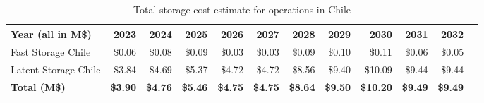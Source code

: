 \tiny \begin{longtable} { |p{}  |r  |r  |r  |r  |r  |r  |r  |r  |r  |r  |r |} 
\caption{Total storage cost estimate for operations in Chile \label{tab:opsStorageChile}}\\ 
\hline 
\textbf{Year (all in M\$)}&\textbf{2023}&\textbf{2024}&\textbf{2025}&\textbf{2026}&\textbf{2027}&\textbf{2028}&\textbf{2029}&\textbf{2030}&\textbf{2031}&\textbf{2032} \\ \hline
{Fast Storage Chile}&{\$0.06}&{\$0.08}&{\$0.09}&{\$0.03}&{\$0.03}&{\$0.09}&{\$0.10}&{\$0.11}&{\$0.06}&{\$0.05} \\ \hline
{Latent Storage Chile}&{\$3.84}&{\$4.69}&{\$5.37}&{\$4.72}&{\$4.72}&{\$8.56}&{\$9.40}&{\$10.09}&{\$9.44}&{\$9.44} \\ \hline
\textbf{Total (M\$)}&\textbf{\$3.90}&\textbf{\$4.76}&\textbf{\$5.46}&\textbf{\$4.75}&\textbf{\$4.75}&\textbf{\$8.64}&\textbf{\$9.50}&\textbf{\$10.20}&\textbf{\$9.49}&\textbf{\$9.49} \\ \hline
\end{longtable} \normalsize
